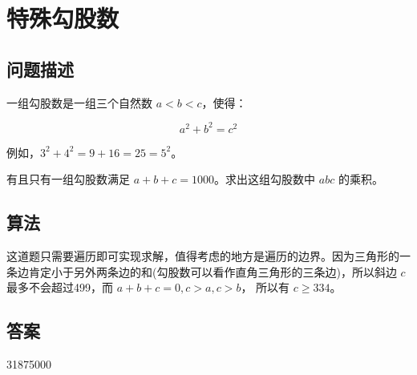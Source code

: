 \section{特殊勾股数}
\subsection{问题描述}
\begin{tcolorbox}
	一组勾股数是一组三个自然数 \( a < b < c \)，使得：

	\[
		a^2 + b^2 = c^2
	\]

	例如，\( 3^2 + 4^2 = 9 + 16 = 25 = 5^2 \)。

	有且只有一组勾股数满足 \( a + b + c = 1000 \)。求出这组勾股数中 \( abc \) 的乘积。
\end{tcolorbox}

\subsection{算法}
这道题只需要遍历即可实现求解，值得考虑的地方是遍历的边界。因为三角形的一条边肯定小于另外两条边的和(勾股数可以看作直角三角形的三条边)，所以斜边
\( c \) 最多不会超过499，而 \( a + b + c = 0, c > a, c > b \)， 所以有 \( c \geqslant 334 \)。

\subsection{答案}
31875000

